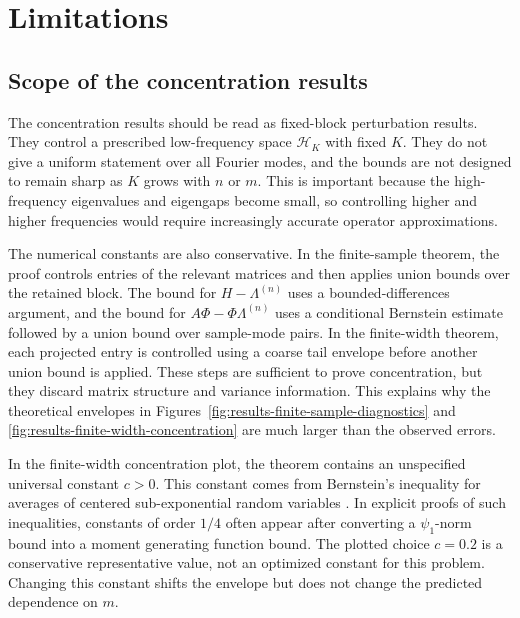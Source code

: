 \section{Limitations}
\label{sec:discussion-limitations}

\subsection{Scope of the concentration results}
\label{subsec:discussion-limitations-concentration}

The concentration results should be read as fixed-block perturbation results.
They control a prescribed low-frequency space \(\mathcal H_K\) with fixed \(K\).
They do not give a uniform statement over all Fourier modes, and the bounds are
not designed to remain sharp as \(K\) grows with \(n\) or \(m\). This is important
because the high-frequency eigenvalues and eigengaps become small, so controlling
higher and higher frequencies would require increasingly accurate operator
approximations.

The numerical constants are also conservative. In the finite-sample theorem, the
proof controls entries of the relevant matrices and then applies union bounds
over the retained block. The bound for \(H-\Lambda^{(n)}\) uses a
bounded-differences argument, and the bound for
\(A\Phi-\Phi\Lambda^{(n)}\) uses a conditional Bernstein estimate followed by a
union bound over sample-mode pairs. In the finite-width theorem, each projected
entry is controlled using a coarse tail envelope before another union bound is
applied. These steps are sufficient to prove concentration, but they discard
matrix structure and variance information. This explains why the theoretical
envelopes in Figures~\ref{fig:results-finite-sample-diagnostics} and
\ref{fig:results-finite-width-concentration} are much larger than the observed
errors.

In the finite-width concentration plot, the theorem contains an unspecified
universal constant \(c>0\). This constant comes from Bernstein's inequality for
averages of centered sub-exponential random variables
\citep{Vershynin_2018a}. In explicit proofs of such inequalities, constants of
order \(1/4\) often appear after converting a \(\psi_1\)-norm bound into a
moment generating function bound. The plotted choice \(c=0.2\) is a conservative
representative value, not an optimized constant for this problem. Changing this
constant shifts the envelope but does not change the predicted dependence on
\(m\).

